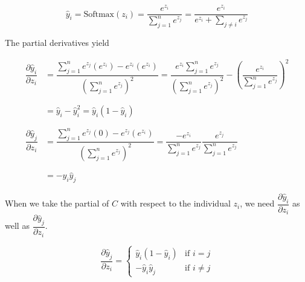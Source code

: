 \documentclass[pageno]{final_paper}
\begin{document}
\begin{equation}
    \label{eq: output layer value}
    \hat{y}_i = \text{Softmax}(z_i) = \dfrac{e^{z_i}}{\sum\limits_{j=1}^n e^{z_j}} = \dfrac{e^{z_i}}
    {e^{z_i} + \sum\limits_{j\neq i} e^{z_j}}
\end{equation}

The partial derivatives yield

\begin{equation}
    \label{eq: output partials}
    \begin{aligned}
        \dfrac{\partial \hat{y}_i}{\partial z_i} &= \dfrac{\sum\limits_{j=1}^n e^{z_j}(e^{z_i}) - e^{z_i}(e^{z_i})}
        {\left( \sum\limits_{j=1}^n e^{z_j} \right)^2}
        = \dfrac{e^{z_i}\sum\limits_{j=1}^n e^{z_j}}{\left( \sum\limits_{j=1}^n e^{z_j} \right)^2}
        - \left( \dfrac{e^{z_i}}{ \sum\limits_{j=1}^n e^{z_j} } \right)^2 \\
        &\phantom{=} \\
        &= \hat{y}_i - \hat{y}_i^2
        = \hat{y}_i\left( 1 - \hat{y}_i \right) \\
        &\phantom{=} \\
        \dfrac{\partial \hat{y}_j}{\partial z_i} &= \dfrac{\sum\limits_{j=1}^n e^{z_j}(0) - e^{z_j}(e^{z_i})}
        {\left( \sum\limits_{j=1}^n e^{z_j} \right)^2}
        = \dfrac{-e^{z_i}}{\sum\limits_{j=1}^n e^{z_j}}\dfrac{e^{z_j}}{\sum\limits_{j=1}^n e^{z_j}} \\
        &\phantom{=} \\
        &= -\hat{y}_i\hat{y}_j
    \end{aligned}
\end{equation}

\newpage
When we take the partial of $C$ with respect to the individual $z_i$, we need
$\dfrac{\partial \hat{y}_i}{\partial z_i}$ as well as $\dfrac{\partial
\hat{y}_j}{\partial z_i}$.

$$
\dfrac{\partial \hat{y}_j}{\partial z_i} =
\begin{cases}
    \hat{y}_i(1-\hat{y}_i) & \text{if } i = j \\
    -\hat{y}_i\hat{y}_j & \text{if } i \neq j
\end{cases}
$$
\end{document}
